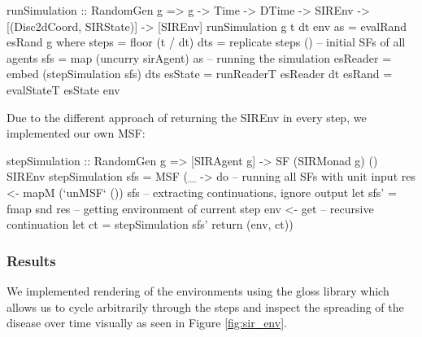 \begin{HaskellCode}
runSimulation :: RandomGen g => g -> Time -> DTime 
  -> SIREnv -> [(Disc2dCoord, SIRState)] -> [SIREnv]
runSimulation g t dt env as = evalRand esRand g
  where
    steps    = floor (t / dt)
    dts      = replicate steps ()
    -- initial SFs of all agents
    sfs      = map (uncurry sirAgent) as   
    -- running the simulation   
    esReader = embed (stepSimulation sfs) dts 
    esState  = runReaderT esReader dt 
    esRand   = evalStateT esState env     
\end{HaskellCode}

Due to the different approach of returning the SIREnv in every step, we implemented our own MSF:
\begin{HaskellCode}
stepSimulation :: RandomGen g 
  => [SIRAgent g] -> SF (SIRMonad g) () SIREnv
stepSimulation sfs = MSF (\_ -> do
  -- running all SFs with unit input
  res <- mapM (`unMSF` ()) sfs
  -- extracting continuations, ignore output
  let sfs' = fmap snd res
  -- getting environment of current step   
  env <- get
  -- recursive continuation    
  let ct = stepSimulation sfs'  
  return (env, ct))
\end{HaskellCode}

\subsubsection{Results}
We implemented rendering of the environments using the gloss library which allows us to cycle arbitrarily through the steps and inspect the spreading of the disease over time visually as seen in Figure \ref{fig:sir_env}.

